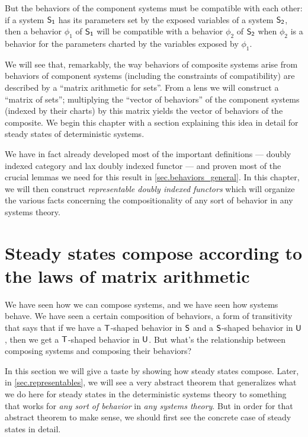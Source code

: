 \documentclass[DynamicalBook]{subfiles}
\begin{document}
But the behaviors of the component systems must be compatible with
each other: if a system $\mathsf{S_1}$ has its parameters set by the exposed
variables of a system $\mathsf{S_2}$, then a behavior $\phi_1$ of $\mathsf{S_1}$ will be
compatible with a behavior $\phi_2$ of $\mathsf{S_2}$ when $\phi_2$ is a behavior
for the parameters charted by the variables exposed by $\phi_1$.

We will see that, remarkably, the way behaviors of composite systems arise from
behaviors of component systems (including the constraints of compatibility) are
described by a ``matrix arithmetic for sets''. From a lens we will construct a
``matrix of sets''; multiplying the ``vector of behaviors'' of the component
systems (indexed by their
charts) by this matrix yields the vector of behaviors of the composite. We begin this chapter with a
section explaining this idea in detail for steady states of deterministic
systems.

We have in fact already developed most of the important definitions --- doubly indexed category and lax doubly indexed functor --- and proven most of the crucial lemmas we need for this
result in \cref{sec.behaviors_general}. In this chapter, we will then construct \emph{representable doubly indexed
  functors} which will organize the various facts concerning the
compositionality of any sort of behavior in any systems theory.



\section{Steady states compose according to the laws of matrix arithmetic}\label{sec.steady_states_matrix_arithmetic}


We have seen how we can compose systems, and we have seen how systems behave. We
have seen a certain composition of behaviors, a form of transitivity that says
that if we have a $\mathsf{T}$-shaped behavior in $\mathsf{S}$ and a $\mathsf{S}$-shaped
behavior in $\mathsf{U}$, then we get a $\mathsf{T}$-shaped behavior in $\mathsf{U}$. But what's the relationship between composing systems and composing their behaviors?

In this section we will give a
taste by showing how steady states compose. Later, in \cref{sec.representables}, we will see a very abstract
theorem that generalizes what we do here for steady states in the deterministic
systems theory to something that works for \emph{any sort of behavior} in \emph{any systems theory}.
But in order for that abstract theorem to make sense, we should first see the concrete
case of steady states in detail.  
\end{document}

